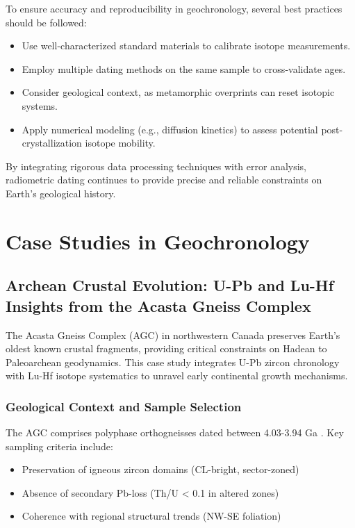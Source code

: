 \documentclass{article}
\begin{document}
To ensure accuracy and reproducibility in geochronology, several best practices should be followed:

\begin{itemize}
    \item Use well-characterized standard materials to calibrate isotope measurements.
    \item Employ multiple dating methods on the same sample to cross-validate ages.
    \item Consider geological context, as metamorphic overprints can reset isotopic systems.
    \item Apply numerical modeling (e.g., diffusion kinetics) to assess potential post-crystallization isotope mobility.
\end{itemize}

By integrating rigorous data processing techniques with error analysis, radiometric dating continues to provide precise and reliable constraints on Earth's geological history.

\section{Case Studies in Geochronology}
\subsection{Archean Crustal Evolution: U-Pb and Lu-Hf Insights from the Acasta Gneiss Complex}
\label{subsec:acasta_case}

The Acasta Gneiss Complex (AGC) in northwestern Canada preserves Earth's oldest known crustal fragments, providing critical constraints on Hadean to Paleoarchean geodynamics. This case study integrates U-Pb zircon chronology with Lu-Hf isotope systematics to unravel early continental growth mechanisms.

\subsubsection*{Geological Context and Sample Selection}
The AGC comprises polyphase orthogneisses dated between 4.03-3.94 Ga \cite{Bowring1999}. Key sampling criteria include:
\begin{itemize}
    \item Preservation of igneous zircon domains (CL-bright, sector-zoned)
    \item Absence of secondary Pb-loss (Th/U < 0.1 in altered zones)
    \item Coherence with regional structural trends (NW-SE foliation)
\end{itemize}
\end{document}
